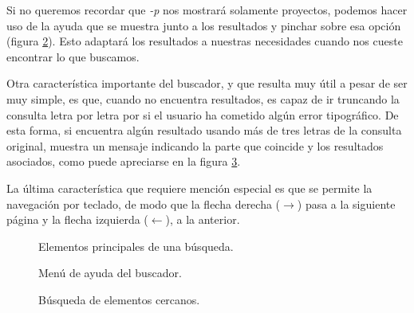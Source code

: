 Si no queremos recordar que \textit{-p} nos mostrará solamente proyectos,
podemos hacer uso de la ayuda que se muestra junto a los resultados y pinchar
sobre esa opción (figura \ref{fig:buscador_ayuda}). Esto adaptará los
resultados a nuestras necesidades cuando nos cueste encontrar lo que buscamos.

Otra característica importante del buscador, y que resulta muy útil a pesar de
ser muy simple, es que, cuando no encuentra resultados, es capaz de ir
truncando la consulta letra por letra por si el usuario ha cometido algún error
tipográfico. De esta forma, si encuentra algún resultado usando más de tres
letras de la consulta original, muestra un mensaje indicando la parte que
coincide y los resultados asociados, como puede apreciarse en la figura
\ref{fig:buscador_cercanos}.

La última característica que requiere mención especial es que se permite la
navegación por teclado, de modo que la flecha derecha ($\rightarrow$) pasa a la
siguiente página y la flecha izquierda ($\leftarrow$), a la anterior.

\begin{figure}
\centering
{}
\caption{Elementos principales de una búsqueda.}
\label{fig:buscador_elementos}
\end{figure}

\begin{figure}
\centering
{}
\caption{Menú de ayuda del buscador.}
\label{fig:buscador_ayuda}
\end{figure}

\begin{figure}
\centering
{}
\caption{Búsqueda de elementos cercanos.}
\label{fig:buscador_cercanos}
\end{figure}
